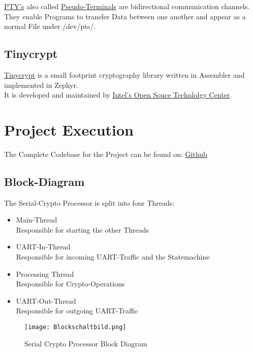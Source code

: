 \href{https://linux.die.net/man/7/pty}
{PTY's} also called
\href{https://linux.die.net/man/7/pty}
{Pseudo-Terminals} are bidirectional communication channels.
They enable Programs to transfer Data between one another
and appear as a normal File under /dev/pts/.

\subsection{Tinycrypt}

\href{https://01.org/tinycrypt}
{Tinycrypt} is a small footprint cryptography library written
in Assembler and implemented in Zephyr.
\\
It is developed and maintained by
\href{https://01.org/}
{Intel's Open Souce Technlolgy Center}.

\pagebreak

\section{Project Execution}

The Complete Codebase for the Project can be found on:
\href{https://github.com/davirieser/zephyr}
{Github}

\subsection{Block-Diagram}

The Serial-Crypto Processor is split into four Threads:
\begin{itemize}
	\item Main-Thread\\
		Responsible for starting the other Threads
	\item UART-In-Thread\\
		Responsible for incoming UART-Traffic and the Statemachine
	\item Processing Thread\\
		Responsible for Crypto-Operations
	\item UART-Out-Thread\\
		Responsible for outgoing UART-Traffic
\end{itemize}

\begin{figure}[!ht]
	\begin{center}
		\texttt{[image: Blockschaltbild.png]}
		\caption{Serial Crypto Processor Block Diagram}
	\end{center}
\end{figure}

